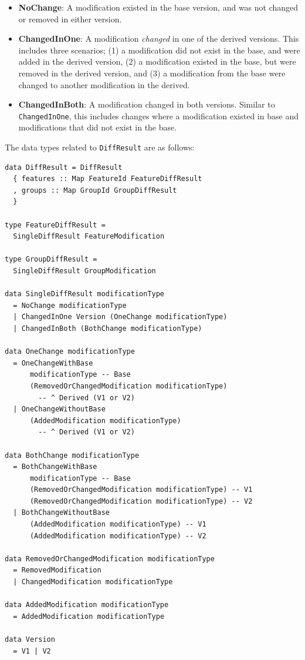 \documentclass[a4paper,english]{ifimaster}
\begin{document}
\begin{itemize}
  \item \textbf{NoChange}: A modification existed in the base version, and was not changed or removed in either version.
  \item \textbf{ChangedInOne}: A modification \textit{changed} in one of the derived versions. This includes three scenarios; (1) a modification did not exist in the base, and were added in the derived version, (2) a modification existed in the base, but were removed in the derived version, and (3) a modification from the base were changed to another modification in the derived.
  \item \textbf{ChangedInBoth}: A modification changed in both versions. Similar to \texttt{ChangedInOne}, this includes changes where a modification existed in base and modifications that did not exist in the base.
\end{itemize}

The data types related to \texttt{DiffResult} are as follows:

\begin{verbatim}
data DiffResult = DiffResult
  { features :: Map FeatureId FeatureDiffResult
  , groups :: Map GroupId GroupDiffResult
  }

type FeatureDiffResult =
  SingleDiffResult FeatureModification

type GroupDiffResult =
  SingleDiffResult GroupModification

data SingleDiffResult modificationType
  = NoChange modificationType
  | ChangedInOne Version (OneChange modificationType)
  | ChangedInBoth (BothChange modificationType)

data OneChange modificationType
  = OneChangeWithBase
      modificationType -- Base
      (RemovedOrChangedModification modificationType)
        -- ^ Derived (V1 or V2)
  | OneChangeWithoutBase
      (AddedModification modificationType) 
        -- ^ Derived (V1 or V2)

data BothChange modificationType
  = BothChangeWithBase
      modificationType -- Base
      (RemovedOrChangedModification modificationType) -- V1
      (RemovedOrChangedModification modificationType) -- V2
  | BothChangeWithoutBase
      (AddedModification modificationType) -- V1
      (AddedModification modificationType) -- V2

data RemovedOrChangedModification modificationType
  = RemovedModification
  | ChangedModification modificationType

data AddedModification modificationType
  = AddedModification modificationType

data Version
  = V1 | V2
\end{verbatim}
\end{document}
